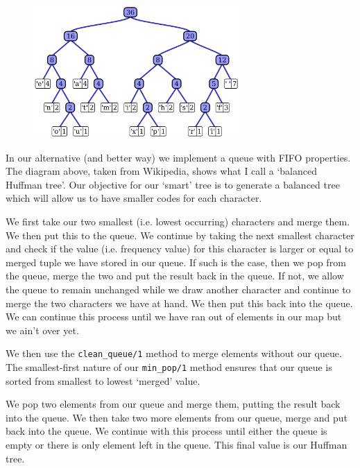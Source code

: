 \begin{figure}[h!]
    \centering
    \includegraphics[width=0.7\textwidth]{huffman}
\end{figure}
In our alternative (and better way) we implement a queue with FIFO properties. The diagram above, taken from Wikipedia, shows what I call a `balanced Huffman tree'. Our objective for our `smart' tree is to generate a balanced tree which will allow us to have smaller codes for each character.

We first take our two smallest (i.e. lowest occurring) characters and merge them. We then put this to the queue.
We continue by taking the next smallest character and check if the value (i.e. frequency value) for this character is larger or equal to merged tuple we have stored in our queue. If such is the case, then we pop from the queue, merge the two and put the result back in the queue. If not, we allow the queue to remain unchanged while we draw another character and continue to merge the two characters we have at hand. We then put this back into the queue. We can continue this process until we have ran out of elements in our map but we ain't over yet.

We then use the \texttt{clean\_queue/1} method to merge elements without our queue. The smallest-first nature of our \texttt{min\_pop/1} method ensures that our queue is sorted from smallest to lowest `merged' value.

We pop two elements from our queue and merge them, putting the result back into the queue. We then take two more elements from our queue, merge and put back into the queue. We continue with this process until either the queue is empty or there is only element left in the queue. This final value is our Huffman tree.

